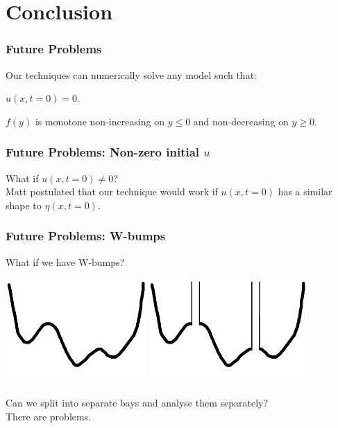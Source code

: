 
\section{Conclusion}
	\begin{frame}
		\frametitle{Future Problems}
		Our techniques can numerically solve any model such that:
		\be
			\item $u(x,t=0) = 0$.
			\item $f(y)$ is monotone non-increasing on $y \leq 0$ and non-decreasing on $y \geq 0$.
		\ee
	\end{frame}
	
	\begin{frame}
		\frametitle{Future Problems: Non-zero initial $u$}
		What if $u(x,t=0) \neq 0$?\\
		Matt postulated that our technique would work if $u(x,t=0)$ has a similar shape to $\eta(x,t=0)$.
	\end{frame}

	\begin{frame}
		\frametitle{Future Problems: W-bumps}
		What if we have W-bumps?
		\begin{center}
			\includegraphics[width = 0.4\textwidth]{wbumps1.png}
			\quad
			\includegraphics[width = 0.45\textwidth]{wbumps2.png}
		\end{center}
		Can we split into separate bays and analyse them separately?\\
		There are problems.
	\end{frame}



